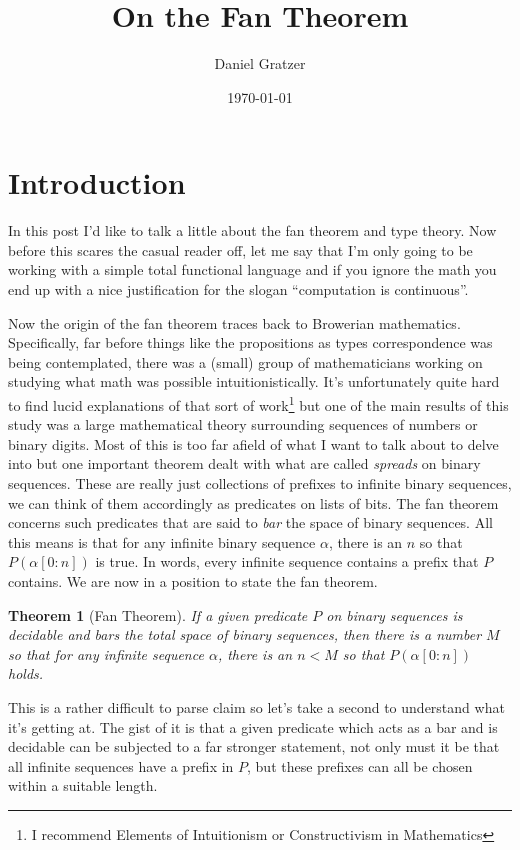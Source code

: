 \documentclass[12pt]{amsart}
\title{On the Fan Theorem}
\author{Daniel Gratzer}
\date{\today}
\newtheorem{thm}{Theorem}[section]
\begin{document}
\maketitle

\section{Introduction}

In this post I'd like to talk a little about the fan theorem and type
theory. Now before this scares the casual reader off, let me say that
I'm only going to be working with a simple total functional language
and if you ignore the math you end up with a nice justification for
the slogan ``computation is continuous''.

Now the origin of the fan theorem traces back to Browerian
mathematics. Specifically, far before things like the propositions as
types correspondence was being contemplated, there was a (small) group
of mathematicians working on studying what math was possible
intuitionistically. It's unfortunately quite hard to find lucid
explanations of that sort of work\footnote{I recommend Elements of
  Intuitionism or Constructivism in Mathematics} but one of the main
results of this study was a large mathematical theory surrounding
sequences of numbers or binary digits. Most of this is too far afield
of what I want to talk about to delve into but one important theorem
dealt with what are called \emph{spreads} on binary sequences. These
are really just collections of prefixes to infinite binary sequences,
we can think of them accordingly as predicates on lists of bits. The
fan theorem concerns such predicates that are said to \emph{bar} the
space of binary sequences. All this means is that for any infinite
binary sequence $\alpha$, there is an $n$ so that $P(\alpha[0:n])$ is
true. In words, every infinite sequence contains a prefix that $P$
contains. We are now in a position to state the fan theorem.
\begin{thm}[Fan Theorem]
  If a given predicate $P$ on binary sequences is \emph{decidable} and
  \emph{bars} the total space of binary sequences, then there is a
  number $M$ so that for any infinite sequence $\alpha$, there is an
  $n < M$ so that $P(\alpha[0:n])$ holds.
\end{thm}
This is a rather difficult to parse claim so let's take a second to
understand what it's getting at. The gist of it is that a given
predicate which acts as a bar and is decidable can be subjected to a
far stronger statement, not only must it be that all infinite
sequences have a prefix in $P$, but these prefixes can all be chosen
within a suitable length.
\end{document}
